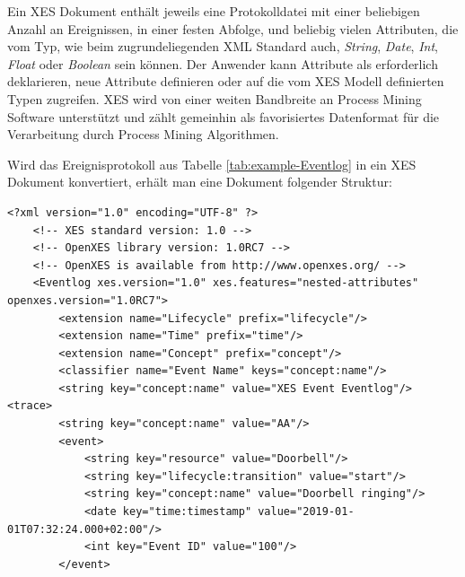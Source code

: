 Ein XES Dokument enthält jeweils eine Protokolldatei mit einer beliebigen Anzahl an Ereignissen, in einer festen Abfolge, und beliebig vielen Attributen, die vom Typ, wie beim zugrundeliegenden XML Standard auch, \textit{String}, \textit{Date}, \textit{Int}, \textit{Float} oder \textit{Boolean} sein können. 
Der Anwender kann Attribute als erforderlich deklarieren, neue Attribute definieren oder auf die vom XES Modell definierten Typen zugreifen. XES  wird von einer weiten Bandbreite an Process Mining Software unterstützt und zählt gemeinhin als favorisiertes Datenformat für die Verarbeitung durch Process Mining Algorithmen.

Wird das Ereignisprotokoll aus Tabelle \ref{tab:example-Eventlog} in ein XES Dokument konvertiert, erhält man eine Dokument folgender Struktur:
\small
\lstset{language=XML}
\begin{lstlisting}[label=lst:xes]
<?xml version="1.0" encoding="UTF-8" ?>
    <!-- XES standard version: 1.0 -->
    <!-- OpenXES library version: 1.0RC7 -->
    <!-- OpenXES is available from http://www.openxes.org/ -->
    <Eventlog xes.version="1.0" xes.features="nested-attributes" openxes.version="1.0RC7">
    	<extension name="Lifecycle" prefix="lifecycle"/>
    	<extension name="Time" prefix="time"/>
    	<extension name="Concept" prefix="concept"/>
    	<classifier name="Event Name" keys="concept:name"/>
    	<string key="concept:name" value="XES Event Eventlog"/>	<trace>
		<string key="concept:name" value="AA"/>
		<event>
			<string key="resource" value="Doorbell"/>
			<string key="lifecycle:transition" value="start"/>
			<string key="concept:name" value="Doorbell ringing"/>
			<date key="time:timestamp" value="2019-01-01T07:32:24.000+02:00"/>
			<int key="Event ID" value="100"/>
		</event>
	
\end{lstlisting}
\normalsize